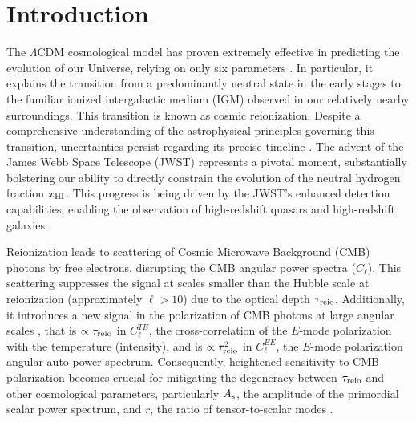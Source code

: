 \section*{Introduction}


The $\Lambda$CDM cosmological model has proven extremely effective in
predicting the evolution of our Universe, relying on only six parameters
\cite{Planck2020a}.
In particular, it explains the transition from a predominantly neutral
state in the early stages to the familiar ionized intergalactic medium
(IGM) observed in our relatively nearby surroundings.
This transition is known as cosmic reionization.
Despite a comprehensive understanding of the astrophysical principles
governing this transition, uncertainties persist regarding its precise
timeline \cite{Jin2023}.
The advent of the James Webb Space Telescope (JWST) \cite{Gardner2006}
represents a pivotal moment, substantially bolstering our ability to
directly constrain the evolution of the neutral hydrogen fraction
$x_{\mathrm{HI}}$.
This progress is being driven by the JWST's enhanced detection
capabilities, enabling the observation of high-redshift quasars
\cite{Eilers2023} and high-redshift galaxies
\cite{Adams2023, Bradley2023, Donnan2023}.

Reionization leads to scattering of Cosmic Microwave Background (CMB)
photons by free electrons, disrupting the CMB angular power spectra
($C_\ell$).
This scattering suppresses the signal at scales smaller than the Hubble
scale at reionization (approximately $\ell>10$) \cite{Planck2020b} due
to the optical depth $\tau_{\mathrm{reio}}$.
Additionally, it introduces a new signal in the polarization of CMB
photons at large angular scales \cite{Planck2020a}, that is $\propto
\tau_{\mathrm{reio}}$ in $C^{TE}_\ell$, the cross-correlation of the $E$-mode
polarization with the temperature (intensity), and is $\propto
\tau_{\mathrm{reio}}^2$ in $C^{EE}_\ell$, the $E$-mode polarization angular auto
power spectrum.
Consequently, heightened sensitivity to CMB polarization becomes crucial
for mitigating the degeneracy between $\tau_{\mathrm{reio}}$ and other
cosmological parameters, particularly $A_\mathrm{s}$, the amplitude of the
primordial scalar power spectrum, and $r$, the ratio of tensor-to-scalar
modes \cite{Natale2020}.


